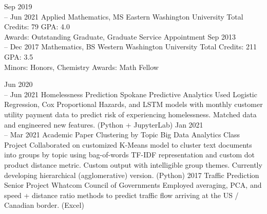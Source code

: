 \documentclass[11pt]{developercv} %
\newcommand{\vsp}{\vspace{-10pt}}
\begin{document}


\begin{entrylist}
	\entry
		{Sep 2019\\
		-- Jun 2021}
		{Applied Mathematics, MS}
		{Eastern Washington University}
		{Total Credits: 79 \hspace{103pt} GPA: 4.0 \\
		Awards: Outstanding Graduate, Graduate Service Appointment
		}
	\entry
		{Sep 2013\\
		-- Dec 2017}
		{Mathematics, BS}
		{Western Washington University}
		{Total Credits: 211 \hspace{100pt} GPA: 3.5 \\
		Minors: Honors, Chemistry
		Awards: Math Fellow
		}
\end{entrylist}

\vsp



\begin{entrylist}
	\entry
	    {Jun 2020 \\
		-- Jun 2021}
	    {Homelessness Prediction}
	    {Spokane Predictive Analytics}
	    {Used Logistic Regression, Cox Proportional Hazards, and LSTM models with monthly customer utility payment data to predict risk of experiencing homelessness. Matched data and engineered new features. (Python + JupyterLab)}
	\entry
		{Jan 2021 \\
		-- Mar 2021}
		{Academic Paper Clustering by Topic}
		{Big Data Analytics Class Project}
		{Collaborated on customized K-Means model to cluster text documents into groups by topic using bag-of-words TF-IDF representation and custom dot product distance metric. Custom output with intelligible group themes. Currently developing hierarchical (agglomerative) version. (Python)}
	\entry
		{2017}
		{Traffic Prediction Senior Project}
		{Whatcom Council of Governments}
		{Employed averaging, PCA, and speed + distance ratio methods to predict traffic flow arriving at the US / Canadian border. (Excel)}
\end{entrylist}
\end{document}
